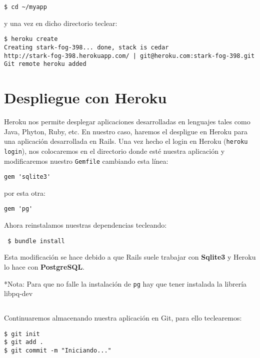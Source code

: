 \begin{verbatim}
$ cd ~/myapp
\end{verbatim}

y una vez en dicho directorio teclear:

\begin{verbatim}
$ heroku create
Creating stark-fog-398... done, stack is cedar
http://stark-fog-398.herokuapp.com/ | git@heroku.com:stark-fog-398.git
Git remote heroku added
\end{verbatim}

\section{Despliegue con Heroku} %
Heroku nos permite desplegar aplicaciones desarrolladas en lenguajes tales como Java, Phyton, Ruby, etc. En nuestro caso, haremos el despligue
en Heroku para una aplicación desarrollada en Rails.
\newline
Una vez hecho el login en Heroku (\verb|heroku login|), nos colocaremos en el directorio donde esté nuestra aplicación y modificaremos nuestro
\verb|Gemfile| cambiando esta línea:

\begin{verbatim}
gem 'sqlite3'
\end{verbatim}

por esta otra:

\begin{verbatim}
gem 'pg'
\end{verbatim}

Ahora reinstalamos nuestras dependencias tecleando:

\begin{verbatim}
 $ bundle install
\end{verbatim}
Esta modificación se hace debido a que Rails suele trabajar con \textbf{Sqlite3} y Heroku lo hace con \textbf{PostgreSQL}.

*Nota: Para que no falle la instalación de \verb|pg| hay que tener instalada la librería libpq-dev

\subsection{}

Continuaremos almacenando nuestra aplicación en Git, para ello teclearemos:
\begin{verbatim}
$ git init
$ git add .
$ git commit -m "Iniciando..."
\end{verbatim}

